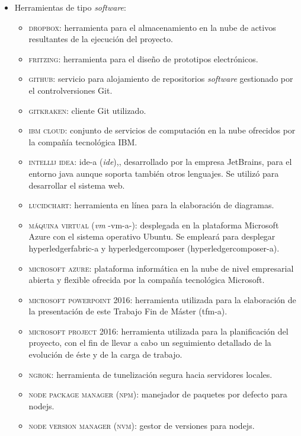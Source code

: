 \documentclass[12pt,a4paper, twoside]{report}
\begin{document}
	\begin{itemize}
		\item Herramientas de tipo \textit{software}:
		\begin{itemize}
			\item \textsc{dropbox:} herramienta para el almacenamiento en la nube de activos resultantes de la ejecución del proyecto.
			\item \textsc{fritzing:} herramienta para el diseño de \glspl{prototipo} electrónicos.
			\item \textsc{github:} servicio para alojamiento de repositorios \textit{software} gestionado por el \gls{controlversiones} Git.
			\item \textsc{gitkraken:} cliente Git utilizado.
			\item \textsc{ibm cloud:} conjunto de servicios de computación en la nube ofrecidos por la compañía tecnológica IBM.
			\item \textsc{intellij idea:} \gls{ide-a} (\textit{\gls{ide}}),, desarrollado por la empresa JetBrains, para el entorno \gls{java} aunque soporta también otros lenguajes. Se utilizó para desarrollar el sistema web.
			\item \textsc{lucidchart:} herramienta en línea para la elaboración de diagramas.
			\item \textsc{máquina virtual} (\textit{\gls{vm}} -\gls{vm-a}-): desplegada en la plataforma Microsoft Azure con el sistema operativo Ubuntu. Se empleará para desplegar \gls{hyperledgerfabric-a} y \gls{hyperledgercomposer} (\gls{hyperledgercomposer-a}).
			\item \textsc{microsoft azure:} plataforma informática en la nube de nivel empresarial abierta y flexible ofrecida por la compañía tecnológica Microsoft.
			\item \textsc{microsoft powerpoint 2016:} herramienta utilizada para la elaboración de la presentación de este Trabajo Fin de Máster (\gls{tfm-a}).
			\item \textsc{microsoft project 2016:} herramienta utilizada para la planificación del proyecto, con el fin de llevar a cabo un seguimiento detallado de la evolución de éste y de la carga de trabajo.
			\item \textsc{ngrok:} herramienta de tunelización segura hacia servidores locales.			
			\item \textsc{node package manager (npm):} manejador de paquetes por defecto para \gls{nodejs}.
			\item \textsc{node version manager (nvm):} gestor de versiones para \gls{nodejs}.

\end{itemize}
\end{itemize}
\end{document}
